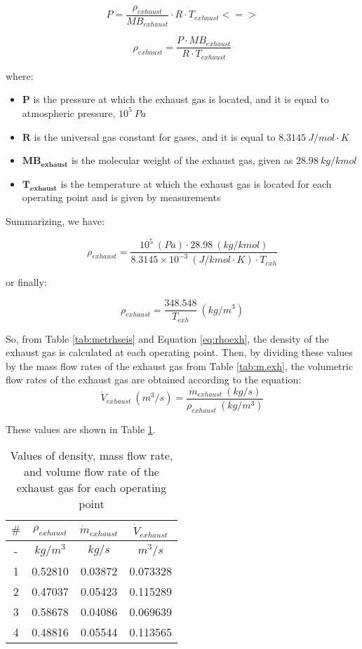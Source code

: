 \documentclass{report}
\begin{document}
$$P=\frac{\rho_{exhaust}}{MB_{exhaust}}\cdot R\cdot T_{exhaust}<=>$$
 
$$\rho_{exhaust}=\frac{P\cdot MB_{exhaust} }{R\cdot T_{exhaust}}$$

where:
\begin{itemize}
 \item $\boldsymbol{P}$ is the pressure at which the exhaust gas is located, and it is equal to atmospheric pressure, $10^5\: Pa$
\item $\boldsymbol{R}$ is the universal gas constant for gases, and it is equal to $8.3145\: J/mol\cdot K$
\item $\boldsymbol{MB_{exhaust}}$ is the molecular weight of the exhaust gas, given as $28.98\: kg/kmol$
\item $\boldsymbol{T_{exhaust}}$ is the temperature at which the exhaust gas is located for each operating point and is given by measurements
\end{itemize}
Summarizing, we have:

$$\rho_{exhaust}=\frac{10^5\: (Pa)\cdot 28.98\: (kg/kmol)}{8.3145\times 10^{-3}\: (J/kmol\cdot K)\cdot T_{exh}}$$

or finally:

\begin{equation}
    \label{eq:rhoexh}
    \rho_{exhaust}=\frac{348.548}{T_{exh}}\: (kg/m^3)
\end{equation}

So, from Table \ref{tab:metrhseis} and Equation \ref{eq:rhoexh}, the density of the exhaust gas is calculated at each operating point. Then, by dividing these values by the mass flow rates of the exhaust gas from Table \ref{tab:m.exh}, the volumetric flow rates of the exhaust gas are obtained according to the equation:
$$\dot{V}_{exhaust}\: (m^3/s)=\frac{\dot{m}_{exhaust}\: (kg/s)}{\rho_{exhaust}\: (kg/m^3)}$$

These values are shown in Table \ref{tab:V.exh}.

\begin{table}[h]
\centering
\renewcommand{\arraystretch}{1.2}
\begin{tabular}{|c|c|c|c|}
\hline
\rowcolor{blue}
$\#$ & $\rho_{exhaust}$ & $\dot{m}_{exhaust}$ & $\dot{V}_{exhaust}$\\
\hline
\rowcolor{gray}
- & $kg/m^3$ & $kg/s$ & $m^3/s$\\
\hline
1 & 0.52810 & 0.03872 & 0.073328\\
\hline
2 & 0.47037 & 0.05423 & 0.115289\\
\hline
3 & 0.58678 & 0.04086 & 0.069639\\
\hline
4 & 0.48816 & 0.05544 & 0.113565\\
\hline
\end{tabular}
\caption{Values of density, mass flow rate, and volume flow rate of the exhaust gas for each operating point}
\label{tab:V.exh}
\end{table}
\end{document}
